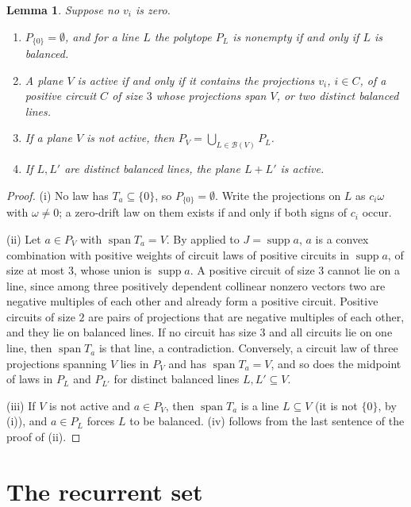 \documentclass[11pt]{article}
\newtheorem{lemma}[theorem]{Lemma}
\theoremstyle{remark}
\DeclareMathOperator{\supp}{supp}
\DeclareMathOperator{\spn}{span}
\begin{document}
\begin{lemma}\label{lem:lines}
Suppose no $v_i$ is zero.
\begin{enumerate}[label=\textup{(\roman*)},nosep]
\item $P_{\{0\}}=\emptyset$, and for a line $L$ the polytope $P_L$ is nonempty if and only if $L$ is balanced.
\item A plane $V$ is active if and only if it contains the projections $v_i$, $i\in C$, of a positive circuit $C$ of
size $3$ whose projections span $V$, or two distinct balanced lines.
\item If a plane $V$ is not active, then $P_V=\bigcup_{L\in\mathcal B(V)}P_L$.
\item If $L,L'$ are distinct balanced lines, the plane $L+L'$ is active.
\end{enumerate}
\end{lemma}

\begin{proof}
(i) No law has $T_a\subseteq\{0\}$, so $P_{\{0\}}=\emptyset$. Write the projections on $L$ as $c_i\omega$ with $\omega\neq 0$; a zero-drift law on them exists if
and only if both signs of $c_i$ occur.

(ii) Let $a\in P_V$ with $\spn T_a=V$. By  applied to $J=\supp a$, $a$ is a convex combination with
positive weights of circuit laws of positive circuits in $\supp a$, of size at most $3$, whose union is $\supp a$. A
positive circuit of size $3$ cannot lie on a line, since among three positively dependent collinear nonzero vectors two are
negative multiples of each other and already form a positive circuit. Positive circuits of size $2$ are pairs of
projections that are negative multiples of each other, and they lie on balanced lines. If no circuit has size $3$ and all circuits lie on one line, then
$\spn T_a$ is that line, a contradiction. Conversely, a circuit law of three projections spanning $V$ lies in $P_V$ and
has $\spn T_a=V$, and so does the midpoint of laws in $P_L$ and $P_{L'}$ for distinct balanced lines $L,L'\subseteq V$.

(iii) If $V$ is not active and $a\in P_V$, then $\spn T_a$ is a line $L\subseteq V$ (it is not $\{0\}$, by (i)), and
$a\in P_L$ forces $L$ to be balanced. (iv) follows from the last sentence of the proof of (ii).
\end{proof}

\section{The recurrent set}\label{sec:rec}
\end{document}

